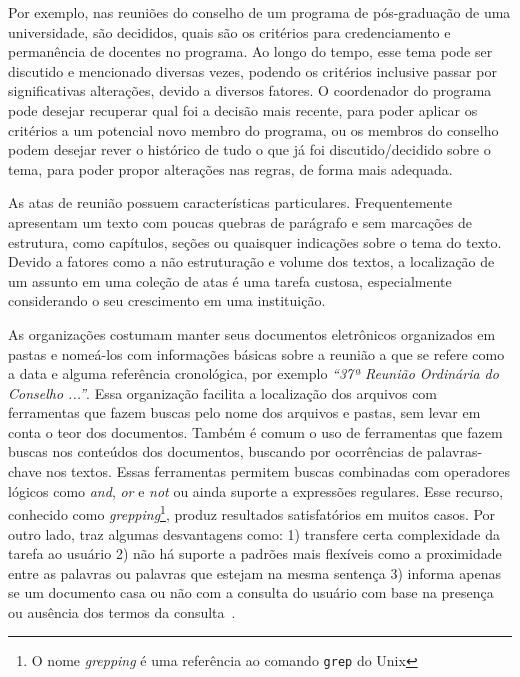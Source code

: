 Por exemplo, nas reuniões do conselho de um programa de pós-graduação de uma universidade, são decididos, quais são os critérios para credenciamento e permanência de docentes no programa. Ao longo do tempo, esse tema pode ser discutido e mencionado diversas vezes, podendo os critérios inclusive passar por significativas alterações, devido a diversos fatores. O coordenador do programa pode desejar recuperar qual foi a decisão mais recente, para poder aplicar os critérios a um potencial novo membro do programa, ou os membros do conselho podem desejar rever o histórico de tudo o que já foi discutido/decidido sobre o tema, para poder propor alterações nas regras, de forma mais adequada.

As atas de reunião possuem características particulares. Frequentemente apresentam um texto com poucas quebras de parágrafo e sem marcações de estrutura, como capítulos, seções ou quaisquer indicações sobre o tema do texto. Devido a fatores como a não estruturação e volume dos textos, a localização de um assunto em uma coleção de atas é uma tarefa custosa, especialmente considerando o seu crescimento em uma instituição. 


As organizações costumam manter seus documentos eletrônicos organizados em pastas e nomeá-los com informações básicas sobre a reunião a que se refere como a data e alguma referência cronológica, por exemplo \textit{``37ª Reunião Ordinária do Conselho ...''}. Essa organização facilita a localização dos arquivos com ferramentas que fazem buscas pelo nome dos arquivos e pastas, sem levar em conta o teor dos documentos. 
%
Também é comum o uso de ferramentas que fazem buscas nos conteúdos dos documentos, buscando por ocorrências de palavras-chave nos textos. Essas ferramentas permitem buscas combinadas com operadores lógicos como \textit{and}, \textit{or} e \textit{not} ou ainda suporte a expressões regulares. Esse recurso, conhecido como \textit{grepping}\footnote{O nome \textit{grepping} é uma referência ao comando \texttt{grep} do Unix}, produz resultados satisfatórios em muitos casos. Por outro lado, traz algumas desvantagens como: 
1) transfere certa complexidade da tarefa ao usuário 
2) não há suporte a padrões mais flexíveis como a proximidade entre as palavras ou palavras que estejam na mesma sentença 
3) informa apenas se um documento casa ou não com a consulta do usuário com base na presença ou ausência dos termos da consulta~\cite{Aggarwal2012,Manning2008}. 
 

